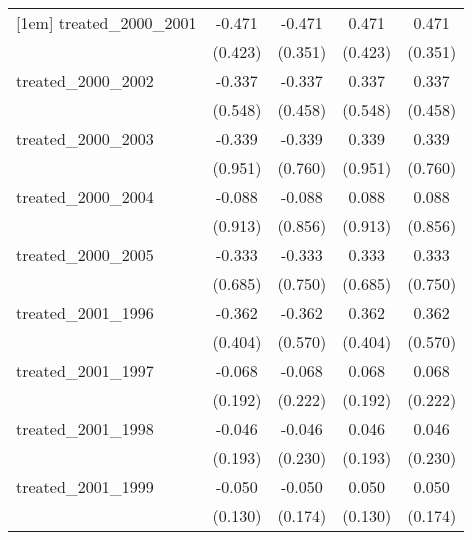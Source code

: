 {\begin{tabular}{l*{4}{c}}
[1em]
treated\_2000\_2001&      -0.471         &      -0.471         &       0.471         &       0.471         \\
            &     (0.423)         &     (0.351)         &     (0.423)         &     (0.351)         \\
[1em]
treated\_2000\_2002&      -0.337         &      -0.337         &       0.337         &       0.337         \\
            &     (0.548)         &     (0.458)         &     (0.548)         &     (0.458)         \\
[1em]
treated\_2000\_2003&      -0.339         &      -0.339         &       0.339         &       0.339         \\
            &     (0.951)         &     (0.760)         &     (0.951)         &     (0.760)         \\
[1em]
treated\_2000\_2004&      -0.088         &      -0.088         &       0.088         &       0.088         \\
            &     (0.913)         &     (0.856)         &     (0.913)         &     (0.856)         \\
[1em]
treated\_2000\_2005&      -0.333         &      -0.333         &       0.333         &       0.333         \\
            &     (0.685)         &     (0.750)         &     (0.685)         &     (0.750)         \\
[1em]
treated\_2001\_1996&      -0.362         &      -0.362         &       0.362         &       0.362         \\
            &     (0.404)         &     (0.570)         &     (0.404)         &     (0.570)         \\
[1em]
treated\_2001\_1997&      -0.068         &      -0.068         &       0.068         &       0.068         \\
            &     (0.192)         &     (0.222)         &     (0.192)         &     (0.222)         \\
[1em]
treated\_2001\_1998&      -0.046         &      -0.046         &       0.046         &       0.046         \\
            &     (0.193)         &     (0.230)         &     (0.193)         &     (0.230)         \\
[1em]
treated\_2001\_1999&      -0.050         &      -0.050         &       0.050         &       0.050         \\
            &     (0.130)         &     (0.174)         &     (0.130)         &     (0.174)         \\

\end{tabular}}
